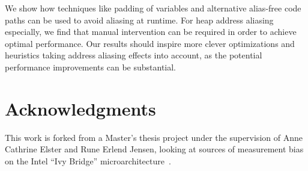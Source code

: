 \documentclass{acm_proc_article-sp}
\begin{document}
We show how techniques like padding of variables and alternative alias-free code paths can be used to avoid aliasing at runtime.
For heap address aliasing especially, we find that manual intervention can be required in order to achieve optimal performance.
Our results should inspire more clever optimizations and heuristics taking address aliasing effects into account, as the potential performance improvements can be substantial.

\section{Acknowledgments}
This work is forked from a Master's thesis project under the supervision of Anne Cathrine Elster and Rune Erlend Jensen, looking at sources of measurement bias on the Intel ``Ivy Bridge'' microarchitecture~\cite{MasterThesis}.





\end{document}
